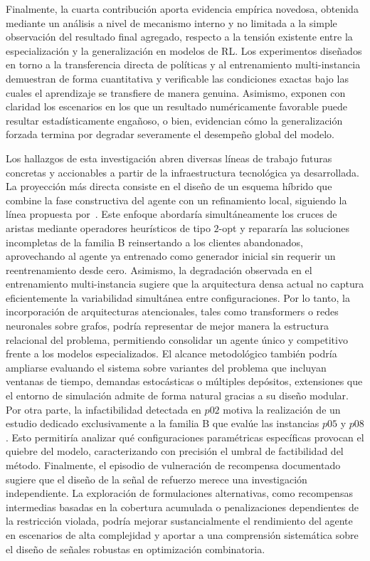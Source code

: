 Finalmente, la cuarta contribución aporta evidencia empírica novedosa, obtenida mediante un análisis a nivel de mecanismo interno y no limitada a la simple observación del resultado final agregado, respecto a la tensión existente entre la especialización y la generalización en modelos de RL. Los experimentos diseñados en torno a la transferencia directa de políticas y al entrenamiento multi-instancia demuestran de forma cuantitativa y verificable las condiciones exactas bajo las cuales el aprendizaje se transfiere de manera genuina. Asimismo, exponen con claridad los escenarios en los que un resultado numéricamente favorable puede resultar estadísticamente engañoso, o bien, evidencian cómo la generalización forzada termina por degradar severamente el desempeño global del modelo.

Los hallazgos de esta investigación abren diversas líneas de trabajo futuras concretas y accionables a partir de la infraestructura tecnológica ya desarrollada. La proyección más directa consiste en el diseño de un esquema híbrido que combine la fase constructiva del agente con un refinamiento local, siguiendo la línea propuesta por~\cite{Chen}. Este enfoque abordaría simultáneamente los cruces de aristas mediante operadores heurísticos de tipo $2$-opt y repararía las soluciones incompletas de la familia B reinsertando a los clientes abandonados, aprovechando al agente ya entrenado como generador inicial sin requerir un reentrenamiento desde cero. Asimismo, la degradación observada en el entrenamiento multi-instancia sugiere que la arquitectura densa actual no captura eficientemente la variabilidad simultánea entre configuraciones. Por lo tanto, la incorporación de arquitecturas atencionales, tales como transformers o redes neuronales sobre grafos, podría representar de mejor manera la estructura relacional del problema, permitiendo consolidar un agente único y competitivo frente a los modelos especializados. El alcance metodológico también podría ampliarse evaluando el sistema sobre variantes del problema que incluyan ventanas de tiempo, demandas estocásticas o múltiples depósitos, extensiones que el entorno de simulación admite de forma natural gracias a su diseño modular. Por otra parte, la infactibilidad detectada en $p02$ motiva la realización de un estudio dedicado exclusivamente a la familia B que evalúe las instancias $p05$ y $p08$. Esto permitiría analizar qué configuraciones paramétricas específicas provocan el quiebre del modelo, caracterizando con precisión el umbral de factibilidad del método. Finalmente, el episodio de vulneración de recompensa documentado sugiere que el diseño de la señal de refuerzo merece una investigación independiente. La exploración de formulaciones alternativas, como recompensas intermedias basadas en la cobertura acumulada o penalizaciones dependientes de la restricción violada, podría mejorar sustancialmente el rendimiento del agente en escenarios de alta complejidad y aportar a una comprensión sistemática sobre el diseño de señales robustas en optimización combinatoria.

